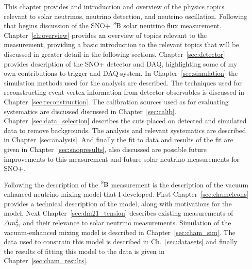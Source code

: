 This chapter provides and introduction and overview of the physics topics
relevant to solar neutrinos, neutrino detection, and neutrino oscillation.
Following that begins discussion of the SNO+ $\ce{^{8}B}$ solar neutrino flux
measurement.
Chapter~\ref{ch:overview} provides an overview of topics relevant to the measurement,
providing a basic introduction to the relevant topics that will be discussed
in greater detail in the following sections.
Chapter~\ref{sec:detector} provides description of the SNO+ detector and DAQ,
highlighting some of my own contributions to trigger and DAQ system.
In Chapter~\ref{sec:simulation} the simulation methods used for the analysis
are described.
The techniques used for reconstructing event vertex information from detector
observables is discussed in Chapter~\ref{sec:reconstruction}.
The calibration sources used as for evaluating systematics are discussed 
discussed in Chapter~\ref{sec:calib}.
Chapter~\ref{sec:data_selection} describes the cuts placed on detected and simulated
data to remove backgrounds.
The analysis and relevant systematics are described in Chapter~\ref{sec:analysis}.
And finally the fit to data and results of the fit are given in Chapter~\ref{sec:snopresults},
also discussed are possible future improvements to this measurement and future solar
neutrino measurements for SNO+.

Following the description of the $\ce{^{8}B}$ measurement is the description
of the vacuum enhanced neutrino mixing model that I developed.
First Chapter~\ref{sec:chameleons} provides a technical description of the model,
along with motivations for the model.
Next Chapter~\ref{sec:dm21_tension} describes existing measurements of
$\Delta m^{2}_{21}$ and their relevance to solar neutrino measurements.
Simulation of the vacuum-enhanced mixing model is described in Chapter~\ref{sec:cham_sim}.
The data used to constrain this model is described in Ch.~\ref{sec:datasets}
and finally the results of fitting this model to the data is given
in Chapter~\ref{sec:cham_results}.

%
%
